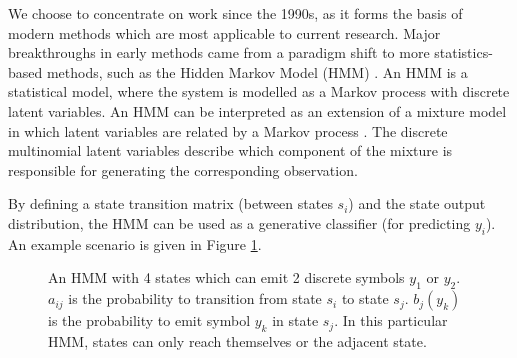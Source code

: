 \documentclass[12pt]{llncs}
\begin{document}
We choose to concentrate on work since the 1990s, as it forms the basis of modern methods which are most applicable to current research. Major breakthroughs in early methods came from a paradigm shift to more statistics-based methods, such as the Hidden Markov Model (HMM) \cite{juang2005automatic}. An HMM is a statistical model, where the system is modelled as a Markov process with discrete latent variables. An HMM can be interpreted as an extension of a mixture model in which latent variables are related by a Markov process \cite{bishop2006pattern}. The discrete multinomial latent variables describe which component of the mixture is responsible for generating the corresponding observation.

By defining a state transition matrix (between states $s_i$) and the state output distribution, the HMM can be used as a generative classifier (for predicting $y_i$). An example scenario is given in Figure \ref{fig:HMM}.

\begin{figure}[htbp]
\begin{center}
\end{center}
\caption{An HMM with 4 states which can emit 2 discrete symbols $y_1$ or $y_2$.
$a_{ij}$ is the probability to transition from state $s_i$ to state $s_j$.
$b_j(y_k)$ is the probability to emit symbol $y_k$ in state $s_j$.
In this particular HMM, states can only reach themselves or the adjacent state.}
\label{fig:HMM}
\end{figure}
\end{document}
